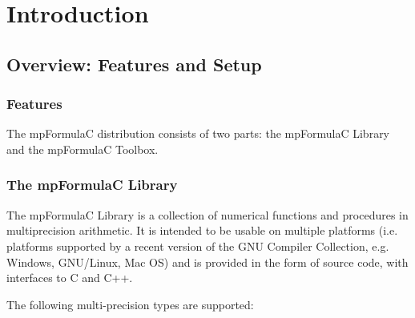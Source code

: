 %
%
%
%
%
%
%
%
%
%
%



\chapter{Introduction}
\label{Introduction1} 



\section{Overview: Features and Setup}


\subsection{Features}
The mpFormulaC distribution consists of two parts: the mpFormulaC Library and the mpFormulaC Toolbox.

\subsection{The mpFormulaC Library}

The mpFormulaC Library is a collection of numerical functions and procedures in multiprecision arithmetic. It is intended to be usable on multiple platforms (i.e. platforms supported by a recent version of the GNU Compiler Collection, e.g. Windows, GNU/Linux, Mac OS) and is provided in the form of source code, with interfaces to C and C++. 

The following multi-precision types are supported:

